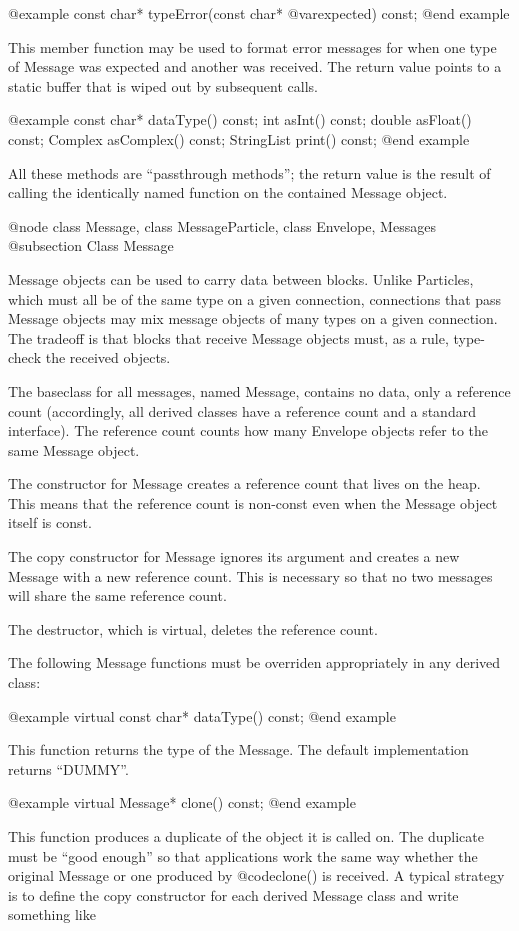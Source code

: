 @example
const char* typeError(const char* @var{expected}) const;
@end example

This member function may be used to format error messages for when
one type of Message was expected and another was received.  The
return value points to a static buffer that is wiped out by subsequent
calls.

@example
const char* dataType() const;
int asInt() const;
double asFloat() const;
Complex asComplex() const;
StringList print() const;
@end example

All these methods are ``passthrough methods''; the return value is the
result of calling the identically named function on the contained
Message object.

@node class Message, class MessageParticle, class Envelope, Messages
@subsection Class Message

Message objects can be used to carry data between blocks.  Unlike
Particles, which must all be of the same type on a given connection,
connections that pass Message objects may mix message objects of
many types on a given connection.  The tradeoff is that blocks that
receive Message objects must, as a rule, type-check the received
objects.

The baseclass for all messages, named Message, contains no data, only
a reference count (accordingly, all derived classes have a reference
count and a standard interface).  The reference count counts how many
Envelope objects refer to the same Message object.

The constructor for Message creates a reference count that lives on
the heap.  This means that the reference count is non-const even when
the Message object itself is const.

The copy constructor for Message ignores its argument and creates a
new Message with a new reference count.  This is necessary so that no
two messages will share the same reference count.

The destructor, which is virtual, deletes the reference count.

The following Message functions must be overriden appropriately in any
derived class:

@example
virtual const char* dataType() const;
@end example

This function returns the type of the Message.  The default
implementation returns ``DUMMY''.

@example
virtual Message* clone() const;
@end example

This function produces a duplicate of the object it is called on.
The duplicate must be ``good enough'' so that applications work the
same way whether the original Message or one produced by @code{clone()}
is received.  A typical strategy is to define the copy constructor
for each derived Message class and write something like


